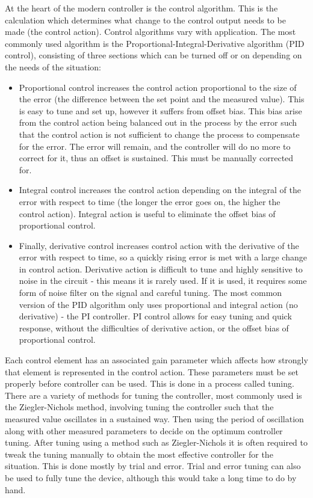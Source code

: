 \documentclass[twoside,a4]{report}
\def\br{\newline \newline \noindent}
\begin{document}
	At the heart of the modern controller is the control algorithm. This is the calculation which determines what change to the control output needs to be made (the control action). Control algorithms vary with application. The most commonly used algorithm is the Proportional-Integral-Derivative algorithm (PID control), consisting of three sections which can be turned off or on depending on the needs of the situation:
	\begin{itemize}
	\item Proportional control increases the control action proportional to the size of the error (the difference between the set point and the measured value). This is easy to tune and set up, however it suffers from offset bias. This bias arise from the control action being balanced out in the process by the error such that the control action is not sufficient to change the process to compensate for the error. The error will remain, and the controller will do no more to correct for it, thus an offset is sustained. This must be manually corrected for.
	\item Integral control increases the control action depending on the integral of the error with respect to time (the longer the error goes on, the higher the control action). Integral action is useful to eliminate the offset bias of proportional control.
	\item Finally, derivative control increases control action with the derivative of the error with respect to time, so a quickly rising error is met with a large change in control action. Derivative action is difficult to tune and highly sensitive to noise in the circuit - this means it is rarely used. If it is used, it requires some form of noise filter on the signal and careful tuning. The most common version of the PID algorithm only uses proportional and integral action (no derivative) - the PI controller. PI control allows for easy tuning and quick response, without the difficulties of derivative action, or the offset bias of proportional control.
	\end{itemize}
	Each control element has an associated gain parameter which affects how strongly that element is represented in the control action. These parameters must be set properly before controller can be used. This is done in a process called tuning. There are a variety of methods for tuning the controller, most commonly used is the Ziegler-Nichols method, involving tuning the controller such that the measured value oscillates in a sustained way. Then using the period of oscillation along with other measured parameters to decide on the optimum controller tuning. After tuning using a method such as Ziegler-Nichols it is often required to tweak the tuning manually to obtain the most effective controller for the situation. This is done mostly by trial and error. Trial and error tuning can also be used to fully tune the device, although this would take a long time to do by hand. \br
\end{document}
